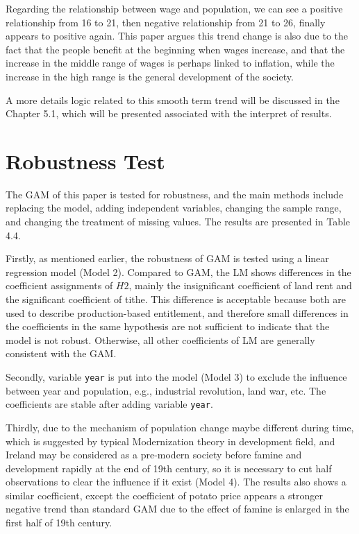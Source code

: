 Regarding the relationship between wage and population, we can see a positive relationship from 16 to 21, then negative relationship from 21 to 26, finally appears to positive again. This paper argues this trend change is also due to the fact that the people benefit at the beginning when wages increase, and that the increase in the middle range of wages is perhaps linked to inflation, while the increase in the high range is the general development of the society. 

A more details logic related to this smooth term trend will be discussed in the Chapter 5.1, which will be presented associated with the interpret of results.

\newpage

\section{Robustness Test}

The GAM of this paper is tested for robustness, and the main methods include replacing the model, adding independent variables, changing the sample range, and changing the treatment of missing values. The results are presented in Table 4.4.

Firstly, as mentioned earlier, the robustness of GAM is tested using a linear regression model (Model 2). Compared to GAM, the LM shows differences in the coefficient assignments of $H2$, mainly the insignificant coefficient of land rent and the significant coefficient of tithe. This difference is acceptable because both are used to describe production-based entitlement, and therefore small differences in the coefficients in the same hypothesis are not sufficient to indicate that the model is not robust. Otherwise, all other coefficients of LM are generally consistent with the GAM.

Secondly, variable \texttt{year} is put into the model (Model 3) to exclude the influence between year and population, e.g., industrial revolution, land war, etc. The coefficients are stable after adding variable \texttt{year}.

Thirdly, due to the mechanism of population change maybe different during time, which is suggested by typical Modernization theory \citep{tipps1973modernization} in development field, and Ireland may be considered as a pre-modern society before famine and development rapidly at the end of 19th century, so it is necessary to cut half observations to clear the influence if it exist (Model 4). The results also shows a similar coefficient, except the coefficient of potato price appears a stronger negative trend than standard GAM due to the effect of famine is enlarged in the first half of 19th century.

